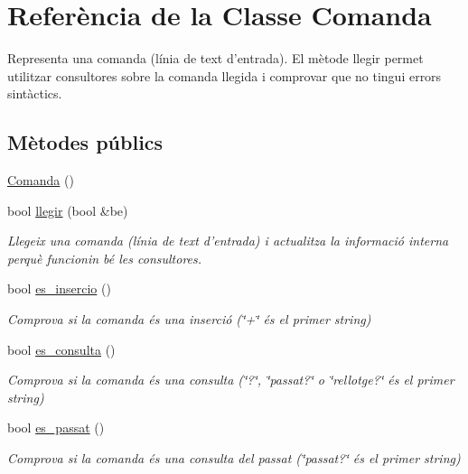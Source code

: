 \hypertarget{class_comanda}{\section{Referència de la Classe Comanda}
\label{class_comanda}
}


Representa una comanda (línia de text d'entrada). El mètode llegir permet utilitzar consultores sobre la comanda llegida i comprovar que no tingui errors sintàctics.  


\subsection*{Mètodes públics}
\begin{DoxyCompactItemize}
\item 
\hyperlink{class_comanda_a0f09e7aa5b7c15f131020d04bf5a8a94}{Comanda} ()
\item 
bool \hyperlink{class_comanda_af2dbc8ccdbb94bed6ea26155edc71b57}{llegir} (bool \&be)
\begin{DoxyCompactList}\small\item\em Llegeix una comanda (línia de text d'entrada) i actualitza la informació interna perquè funcionin bé les consultores. \end{DoxyCompactList}\item 
bool \hyperlink{class_comanda_a614467bedacc9cf29cc5a9dcbba6b23d}{es\-\_\-insercio} ()
\begin{DoxyCompactList}\small\item\em Comprova si la comanda és una inserció (\char`\"{}+\char`\"{} és el primer string) \end{DoxyCompactList}\item 
bool \hyperlink{class_comanda_a847ee227fd7fea3a105dbd78735de453}{es\-\_\-consulta} ()
\begin{DoxyCompactList}\small\item\em Comprova si la comanda és una consulta (\char`\"{}?\char`\"{}, \char`\"{}passat?\char`\"{} o \char`\"{}rellotge?\char`\"{} és el primer string) \end{DoxyCompactList}\item 
bool \hyperlink{class_comanda_a1f435f8b605f0d1f5cbb06c8c6fe4005}{es\-\_\-passat} ()
\begin{DoxyCompactList}\small\item\em Comprova si la comanda és una consulta del passat (\char`\"{}passat?\char`\"{} és el primer string) \end{DoxyCompactList}\item 

\end{DoxyCompactItemize}
